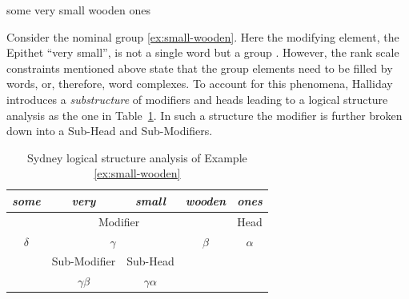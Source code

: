 
\begin{exe}
    \ex \label{ex:small-wooden} some very small wooden ones
\end{exe}

Consider the nominal group \ref{ex:small-wooden}. Here the modifying element, the Epithet ``very small'', is not a single word but a group \citep[390--396]{Halliday2013}. However, the rank scale constraints mentioned above state that the group elements need to be filled by words, or, therefore, word complexes. To account for this phenomena, Halliday introduces a \textit{substructure} of modifiers and heads leading to a logical structure analysis as the one in \mbox{Table \ref{tab:example-substructure-analisys-logical}}. In such a structure the modifier is further broken down into a Sub-Head and Sub-Modifiers. 

\begin{table}[!ht]
    \centering
    \begin{tabular}{c|c|c|cc}
        \hline
        \multicolumn{1}{|c|}{\textit{some}} & \textit{very} & \textit{small} & \multicolumn{1}{c|}{\textit{wooden}} & \multicolumn{1}{c|}{\textit{ones}} \\ \hline
        \multicolumn{4}{|c|}{Modifier}                                                                              & \multicolumn{1}{c|}{Head}          \\ \hline
        \multicolumn{1}{|c|}{$\delta$}             & \multicolumn{2}{c|}{$\gamma$}         & \multicolumn{1}{c|}{$\beta$}               & \multicolumn{1}{c|}{$\alpha$}             \\ \hline
        & Sub-Modifier  & Sub-Head       &                                      &                                    \\ \cline{2-3}    
        \multicolumn{1}{l|}{}               & \multicolumn{1}{c|}{$\gamma\beta$} & \multicolumn{1}{c|}{$\gamma\alpha$} & \multicolumn{1}{l}{}                 & \multicolumn{1}{l}{}               \\ \cline{2-3}
    \end{tabular}
    \caption{Sydney logical structure analysis of Example \ref{ex:small-wooden}}
    \label{tab:example-substructure-analisys-logical}
\end{table}


